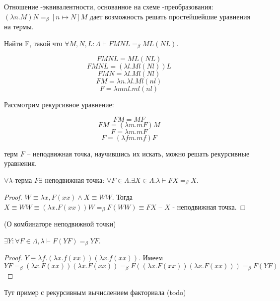 Отношение \beta-эквивалентности, основанное на схеме \beta-преобразования: $(\lambda n. M)N =_{\beta} [n \mapsto N]M$ дает возможность решать простейшейшие уравнения на термы.

\begin{example}
    Найти F, такой что $\forall M, N, L: \Lambda \vdash FMNL =_{\beta} ML(NL)$.

    $$ FMNL = ML(NL) $$
    $$ FMNL = (\lambda l. M l (N l))L $$
    $$ FMN = \lambda l. M l (N l) $$
    $$ FM = \lambda n. \lambda l. M l (n l) $$
    $$ F = \lambda m n l. m l (n l) $$
\end{example}

\begin{example}
    Рассмотрим рекурсивное уравнение:

    $$ FM = MF $$
    $$ FM = (\lambda m . m F) M $$
    $$ F = \lambda m. m F $$
    $$ F = (\lambda f m. m f) F $$

    терм $F$ -- неподвижная точка, научившись их искать, можно решать рекурсивные уравнения.
\end{example}

\begin{theorem}
    $\forall \lambda$-терма $F \exists$ неподвижная точка: $\forall F \in \Lambda. \exists X \in \Lambda. \lambda \vdash FX =_{\beta} X$.
\end{theorem}
\begin{proof}
    $W \equiv \lambda x, F(xx) \land X \equiv WW$. Тогда $X \equiv WW \equiv (\lambda x. F(xx))W =_{\beta} F(WW) \equiv FX$ -- $X$ - неподвижная точка.
\end{proof}

\begin{theorem}
    (О комбинаторе неподвижной точки)
    
    $\exists Y: \forall F \in \Lambda, \lambda \vdash F(YF) =_{\beta} YF$.
\end{theorem}
\begin{proof}
    $Y \equiv\lambda f.(\lambda x. f(xx))(\lambda x. f(xx))$.
    Имеем $$YF =_{\beta} (\lambda x. F(xx))(\lambda x. F(xx)) =_{\beta} F((\lambda x. F(xx))(\lambda x. F(xx))) =_{\beta} F(YF)$$
\end{proof}

\begin{example}
    Тут пример с рекурсивным вычислением факториала (todo)
\end{example}

